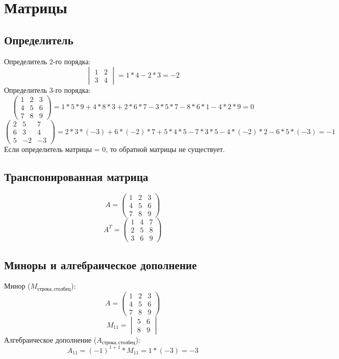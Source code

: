 \documentclass[12pt,a4paper]{article}
\begin{document}
\section{Матрицы}
\subsection{Определитель}
Определитель 2-го порядка:
$$\begin{vmatrix}
1& 2 \\
3& 4
\end{vmatrix}
= 1 * 4 - 2 * 3 = -2$$
Определитель 3-го порядка:
$$\begin{pmatrix}
1& 2& 3 \\
4& 5& 6 \\
7& 8& 9
\end{pmatrix}
= 1*5*9 + 4*8*3 + 2*6*7 - 3*5*7 - 8*6*1 - 4*2*9 = 0$$
$$\begin{pmatrix}
2& 5& 7 \\
6& 3& 4 \\
5& -2& -3
\end{pmatrix}
= 2*3*(-3) + 6*(-2)*7 + 5*4*5 - 7*3*5 - 4*(-2)*2 - 6*5*(-3) = -1$$
Если определитель матрицы = 0, то обратной матрицы не существует.
\subsection{Транспонированная матрица}
$$A=\begin{pmatrix}
1& 2& 3 \\
4& 5& 6 \\
7& 8& 9
\end{pmatrix}$$
$$A^{T}=\begin{pmatrix}
1& 4& 7 \\
2& 5& 8 \\
3& 6& 9
\end{pmatrix}$$
\newpage
\subsection{Миноры и алгебраическое дополнение}
Минор ($M_{строка, столбец}$):
$$A=\begin{pmatrix}
1& 2& 3 \\
4& 5& 6 \\
7& 8& 9
\end{pmatrix}$$
$$M_{11}=\begin{vmatrix}
5& 6 \\
8& 9
\end{vmatrix}$$
Алгебраическое дополнение ($A_{строка, столбец}$):
$$A_{11}=(-1)^{1+1}*M_{11}=1*(-3)=-3$$
\end{document}
